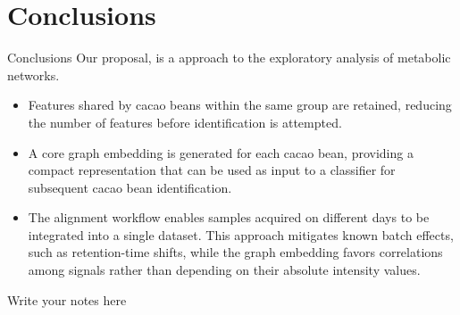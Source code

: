 \documentclass[aspectratio=169]{beamer}
\begin{document}
\section{Conclusions}
    \begin{frame}{Conclusions}
        Our proposal, is a approach to the exploratory analysis of metabolic networks.

        \begin{itemize}
            \item Features shared by cacao beans within the same group are retained, reducing the number of features before identification is attempted.
            
            \item A core graph embedding is generated for each cacao bean, providing a compact representation that can be used as input to a classifier for subsequent cacao bean identification.
            
            \item The alignment workflow enables samples acquired on different days to be integrated into a single dataset. This approach mitigates known batch effects, such as retention-time shifts, while the graph embedding favors correlations among signals rather than depending on their absolute intensity values.
            



        \end{itemize}

        \begin{note}
            {Write your notes here}
        \end{note}
    \end{frame}
\end{document}
